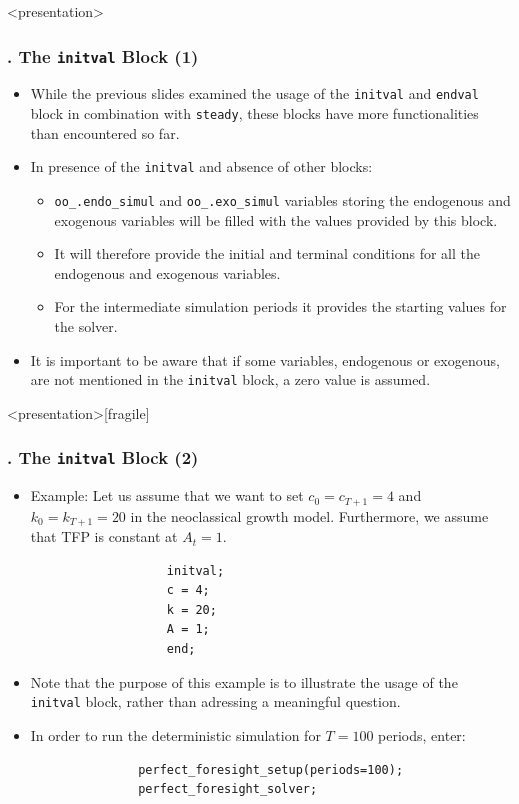 \documentclass[11pt,aspectratio=169]{beamer}
\begin{document}
\begin{frame}<presentation>
	\frametitle{{\thesection.\thesubsection\thinspace\thesubsubsection} The \texttt{initval} Block (1)}
	\begin{itemize}
		\item While the previous slides examined the usage of the \texttt{initval} and \texttt{endval} block in combination with \texttt{steady}, these blocks have more functionalities than encountered so far.
		\item In presence of the \texttt{initval} and absence of other blocks:
		\begin{itemize}
			\item \texttt{oo\_.endo\_simul} and \texttt{oo\_.exo\_simul} variables storing the endogenous and exogenous variables will be filled with the values provided by this block.
			\item It will therefore provide the initial and terminal conditions for all the endogenous and exogenous variables.
			\item For the intermediate simulation periods it provides the starting values for the solver. 
		\end{itemize} 
		\item It is important to be aware that if some variables, endogenous or exogenous, are not mentioned in the \texttt{initval} block, a zero value is assumed.
	\end{itemize}
\end{frame}
\begin{frame}<presentation>[fragile]
	\frametitle{{\thesection.\thesubsection\thinspace\thesubsubsection} The \texttt{initval} Block (2)}
	\begin{itemize}
		\item Example: Let us assume that we want to set $c_0=c_{T+1}=4$ and $k_0=k_{T+1}=20$ in the neoclassical growth model. Furthermore, we assume that TFP is constant at $A_t=1$. 
			\begin{verbatim}
				   initval;
				   c = 4;
				   k = 20;
				   A = 1;
				   end;
			\end{verbatim}
		\item Note that the purpose of this example is to illustrate the usage of the \texttt{initval} block, rather than adressing a meaningful question.
		\item In order to run the deterministic simulation for $T=100$ periods, enter:
			\begin{verbatim}
			   perfect_foresight_setup(periods=100);
			   perfect_foresight_solver;
			\end{verbatim}
	\end{itemize}
\end{frame}
\end{document}
